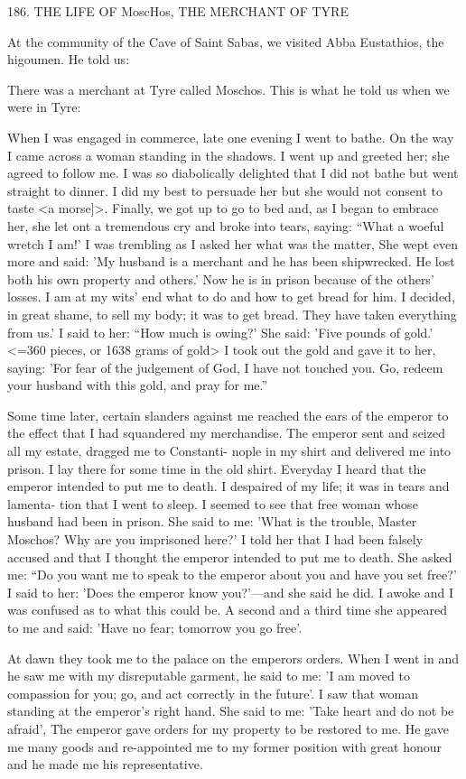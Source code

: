 186.
THE LIFE OF MoscHos,
THE MERCHANT OF TYRE

At the community of the Cave of Saint Sabas, we visited Abba
Eustathios, the higoumen.
He told us:

There was a merchant at Tyre called Moschos.
This is what he told
us when we were in Tyre:

When I was engaged in commerce, late one evening I went to bathe.
On the way I came across a woman standing in the shadows.
I went
up and greeted her; she agreed to follow me.
I was so diabolically
delighted that I did not bathe but went straight to dinner.
I did my
best to persuade her but she would not consent to taste <a morse]>.
Finally, we got up to go to bed and, as I began to embrace her, she
let ont a tremendous cry and broke into tears, saying: “What a
woeful wretch I am!' I was trembling as I asked her what was the
matter, She wept even more and said: 'My husband is a merchant
and he has been shipwrecked.
He lost both his own property and
others.' Now he is in prison because of the others' losses.
I am at
my wits' end what to do and how to get bread for him.
I decided,
in great shame, to sell my body; it was to get bread.
They have
taken everything from us.' I said to her: “How much is owing?' She
said: 'Five pounds of gold.' <=360 pieces, or 1638 grams of gold>
I took out the gold and gave it to her, saying: 'For fear of the
judgement of God, I have not touched you.
Go, redeem your
husband with this gold, and pray for me.”

Some time later, certain slanders against me reached the ears of
the emperor to the effect that I had squandered my merchandise.
The emperor sent and seized all my estate, dragged me to Constanti-
nople in my shirt and delivered me into prison.
I lay there for some
time in the old shirt.
Everyday I heard that the emperor intended to
put me to death.
I despaired of my life; it was in tears and lamenta-
tion that I went to sleep.
I seemed to see that free woman whose
husband had been in prison.
She said to me: 'What is the trouble,
Master Moschos? Why are you imprisoned here?' I told her that I
had been falsely accused and that I thought the emperor intended
to put me to death.
She asked me: “Do you want me to speak to the
emperor about you and have you set free?' I said to her: 'Does the
emperor know you?'—and she said he did.
I awoke and I was
confused as to what this could be.
A second and a third time she
appeared to me and said: 'Have no fear; tomorrow you go free'.

At dawn they took me to the palace on the emperor\textquotesingle s orders.
When I went in and he saw me with my disreputable garment, he
said to me: 'I am moved to compassion for you; go, and act
correctly in the future'.
I saw that woman standing at the emperor's
right hand.
She said to me: 'Take heart and do not be afraid', The
emperor gave orders for my property to be restored to me.
He gave
me many goods and re-appointed me to my former position with
great honour and he made me his representative.

